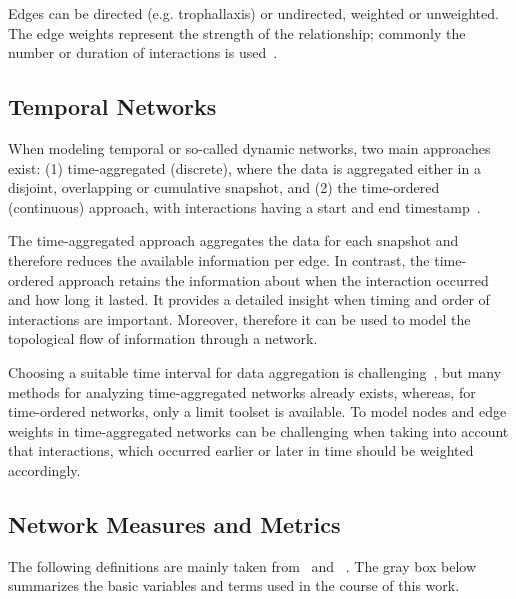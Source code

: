Edges can be directed (e.g. trophallaxis) or undirected, weighted or unweighted. The edge weights represent the strength of the relationship; commonly the number or duration of interactions is used~\cite{farine2015constructing}.


\subsection{Temporal Networks}
When modeling temporal or so-called dynamic networks, two main approaches exist: (1) time-aggregated (discrete), where the data is aggregated either in a disjoint, overlapping or cumulative snapshot, and (2) the time-ordered (continuous) approach, with interactions having a start and end timestamp~\cite{moody2005dynamic, Pinter-Wollman2014, blonder2012temporal}.

The time-aggregated approach aggregates the data for each snapshot and therefore reduces the available information per edge. In contrast, the time-ordered approach retains the information about when the interaction occurred and how long it lasted. It provides a detailed insight when timing and order of interactions are important. Moreover, therefore it can be used to model the topological flow of information through a network.

Choosing a suitable time interval for data aggregation is challenging~\cite{Pinter-Wollman2014}, but many methods for analyzing time-aggregated networks already exists, whereas, for time-ordered networks, only a limit toolset is available. To model nodes and edge weights in time-aggregated networks can be challenging when taking into account that interactions, which occurred earlier or later in time should be weighted accordingly.

\subsection{Network Measures and Metrics}
\label{sec:definitions}
The following definitions are mainly taken from~\textcite{barabasi2016network} and ~\textcite{newman2010networks}. The gray box below summarizes the basic variables and terms used in the course of this work.\\

